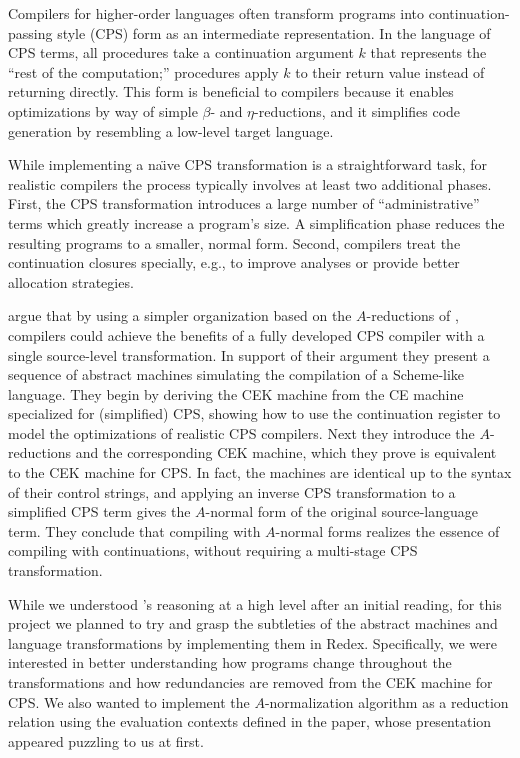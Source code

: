 \documentclass[11pt]{article}
\begin{document}
\thispagestyle{fancy}

Compilers for higher-order languages often transform programs into
continuation-passing style (CPS) form as an intermediate representation. In the
language of CPS terms, all procedures take a continuation argument $k$
that represents the ``rest of the computation;'' procedures apply $k$ to their
return value instead of returning directly. This form is beneficial to
compilers because it enables optimizations by way of simple $\beta$- and
$\eta$-reductions, and it simplifies code generation by resembling a low-level
target language.

While implementing a na\"{\i}ve CPS transformation is a straightforward task,
for realistic compilers the process typically involves at least two additional
phases. First, the CPS transformation introduces a large number of
``administrative'' terms which greatly increase a program's size.
A simplification phase reduces the resulting programs to a smaller, normal
form. Second, compilers treat the continuation closures specially, e.g., to
improve analyses or provide better allocation strategies.

\citet{Flanagan:1993fk} argue that by using a simpler organization based on
the $A$-reductions of \citet{Sabry:1992zr}, compilers could achieve the 
benefits of a fully developed CPS compiler with a single source-level
transformation. In support of their argument they present a sequence of
abstract machines simulating the compilation of a Scheme-like language.
They begin by deriving the CEK machine from the CE machine specialized for
(simplified) CPS, showing how to use the continuation register to model the
optimizations of realistic CPS compilers. Next they introduce the
$A$-reductions and the corresponding CEK machine, which they prove is
equivalent to the CEK machine for CPS. In fact, the machines are identical
up to the syntax of their control strings, and applying an inverse CPS
transformation to a simplified CPS term gives the $A$-normal form of the
original source-language term. They conclude that compiling with $A$-normal
forms realizes the essence of compiling with continuations, without requiring
a multi-stage CPS transformation.

While we understood \citeauthor{Flanagan:1993fk}'s reasoning at a high level
after an initial reading, for this project we planned to try and grasp the
subtleties of the abstract machines and language transformations by
implementing them in Redex. Specifically, we were interested in better
understanding how programs change throughout the transformations and how
redundancies are removed from the CEK machine for CPS. We also wanted to
implement the $A$-normalization algorithm as a reduction relation using the
evaluation contexts defined in the paper, whose presentation appeared puzzling
to us at first.
\end{document}
